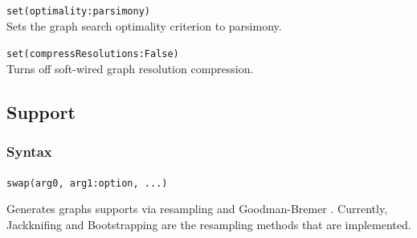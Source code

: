 	\begin{example}
		\item{\texttt{set(optimality:parsimony)}\\Sets the graph search optimality criterion to parsimony.}
						
		\item{\texttt{set(compressResolutions:False)}\\Turns off soft-wired graph resolution compression.}
	\end{example}

\subsection{Support}
	\subsubsection{Syntax}
		\texttt{swap(arg0, arg1:option, ...)}
		
	\begin{phygdescription}
		{Generates graphs supports via resampling \citep{Farrisetal1996} and Goodman-Bremer 
		\citep{Goodmanetal1982, bremer1994}. Currently, Jackknifing and Bootstrapping 
		are the resampling methods that are implemented.}
	\end{phygdescription}
		
